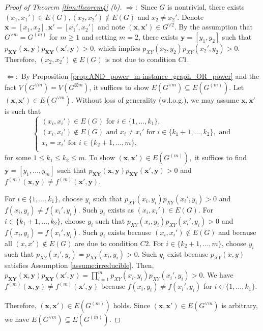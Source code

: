 \documentclass[journal, onecolumn, draftcls]{IEEEtran}
\theoremstyle{definition}
\newcommand{\bfy}{\mathbf{y}}
\newcommand{\bfX}{\mathbf{X}}
\newcommand{\bfY}{\mathbf{Y}}
\newcommand{\bfx}{\mathbf{x}}
\begin{document}
\begin{proof}[Proof of Theorem \ref{thm:theorem4} (b)] 
$\Rightarrow:$ Since $G$ is nontrivial, there  exists $(x_1,x_1')\in E(G), (x_2,x_2')\notin E(G)$ and $x_2\ne x_2'$. Denote $\bfx=[x_1,x_2],\bfx'=[x_1',x_2']$ and note $(\bfx,\bfx')\in G^{\lor 2}$. By the assumption that $G^{\lor m} = G^{(m)}$ for $m\ge 1$ and setting $m=2$, there exists $\bfy = [y_1,y_2]$ such that  $p_{\bfX\bfY}(\bfx,\bfy)p_{\bfX\bfY}(\bfx',\bfy)>0$, which implies $p_{XY}(x_2,y_2)p_{XY}(x_2',y_2)>0$. Therefore, $(x_2,x_2')\notin E(G)$ is not due to condition $C1$. 

$\Leftarrow:$ By Proposition \ref{prop:AND_power_m-instance_graph_OR_power} and the fact $V(G^{\lor m})=V(G^{\boxtimes m})$, it suffices to show $E(G^{\lor m  })\subseteq E(G^{(m)})$.  Let $(\bfx,\bfx')\in E(G^{\lor m})$. Without loss of generality (w.l.o.g.), we may assume $\bfx,\bfx'$ is such that  
$$\begin{cases}
    (x_i,x_i')\in E(G)\text{~for~}i\in\{1,\dots,k_1\},\\
    (x_i,x_i')\notin E(G)\text{~and~} x_i\ne x_i'\text{~for~}i\in\{k_1+1,\dots,k_2\}, \text{~and}\\
    x_i=x_i'\text{~for~}i\in\{k_2+1,\dots,m\},\\
\end{cases}$$  for some $1\le k_1\le k_2\le m$. To show $(\bfx,\bfx')\in E(G^{(m)}),$ it suffices to find $\bfy=[y_1,\dots,y_m]$ such that  $p_{\bfX\bfY}(\bfx,\bfy)p_{\bfX\bfY}(\bfx',\bfy)>0$ and $f^{(m)}(\bfx,\bfy)\ne f^{(m)}(\bfx',\bfy).$

For $i\in\{1,\dots,k_1\}$, choose $y_i$   such that    $p_{XY}(x_i,y_i)p_{XY}(x_i',y_i)>0$ and $f(x_i,y_i)\ne f(x_i',y_i)$. Such $y_i$ exists as $(x_i,x_i')\in E(G)$. For $i\in\{k_1+1,\dots,k_2\}$, choose $y_i$  such that    $p_{XY}(x_i,y_i)p_{XY}(x_i',y_i)>0$ and $f(x_i,y_i)= f(x_i',y_i)$. Such $y_i$ exists because $(x_i,x_i')\notin E(G)$ and because  all $(x,x')\notin E(G)$ are due to condition $C2$.  For $i\in\{k_2+1,\dots,m\}$, choose $y_i$  such that  $p_{XY}(x_i',y_i)=p_{XY}(x_i,y_i) >0$. Such $y_i$ exist because $p_{XY}(x,y)$ satisfies Assumption \ref{assume:irreducible}.  Then, $p_{\bfX\bfY}(\bfx,\bfy)p_{\bfX\bfY}(\bfx',\bfy)=\prod_{i=1}^mp_{XY}(x_i,y_i)p_{XY}(x_i',y_i)>0$. We have $f^{(m)}(\bfx,\bfy)\ne f^{(m)}(\bfx',\bfy)$ because $f(x_i,y_i)\ne f(x_i',y_i)$ for $i\in\{1,\dots,k_1\}$.

Therefore, $(\bfx,\bfx')\in E(G^{(m)})$ holds. Since $(\bfx,\bfx')\in E(G^{\lor m})$ is arbitrary, we have $E(G^{\lor m})\subseteq E(G^{(m)})$.
\end{proof} 
\end{document}
